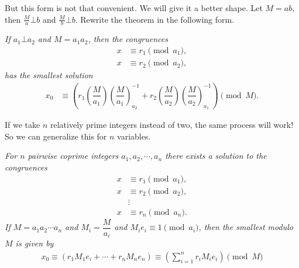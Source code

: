 \documentclass{subfile}
\begin{document}
	But this form is not that convenient. We will give it a better shape. Let $M=ab$, then $\frac{M}{a}\bot b$ and $\frac{M}{b}\bot b$. Rewrite the theorem in the following form.
		\begin{theorem}\slshape
			If $a_1\bot a_2$ and $M=a_1a_2$, then the congruences
			\begin{align*}
			x & \equiv r_1\pmod{a_1},\\
			x & \equiv r_2\pmod{a_2},
			\end{align*}
			has the smallest solution
			\begin{align*}
			x_0 & \equiv
			\left(r_1\left(\dfrac{M}{a_1}\right)\left(\dfrac{M}{a_1}\right)^{-1}_{a_2}+r_2\left(\dfrac{M}{a_2}\right)\left(\dfrac{M}{a_2}\right)^{-1}_{a_1}\right)\pmod{M}.
			\end{align*}
		\end{theorem}
	If we take $n$ relatively prime integers instead of two, the same process will work! So we can generalize this for $n$ variables.
		\begin{theorem}[CRT]\slshape
			For $n$ pairwise coprime integers $a_1,a_2,\cdots,a_n$ there exists a solution to the congruences
				\begin{align*}
					x & \equiv r_1\pmod{a_1},\\
					x & \equiv r_2\pmod{a_2},\\
					   &\vdots\\
					x & \equiv r_n\pmod{a_n}.
				\end{align*}
			If $M=a_1a_2\cdots a_n$ and $M_i=\dfrac{M}{a_i}$ and $M_ie_i\equiv1\pmod{a_i}$, then the smallest  modulo $M$ is given by
			\begin{align*}
			x_0  \equiv \left(r_1 M_1e_i+\cdots+r_n M_ne_n\right)\equiv \left(\sum_{i=1}^{n} r_i M_ie_i\right)\pmod M
			\end{align*}
		\end{theorem}
\end{document}
